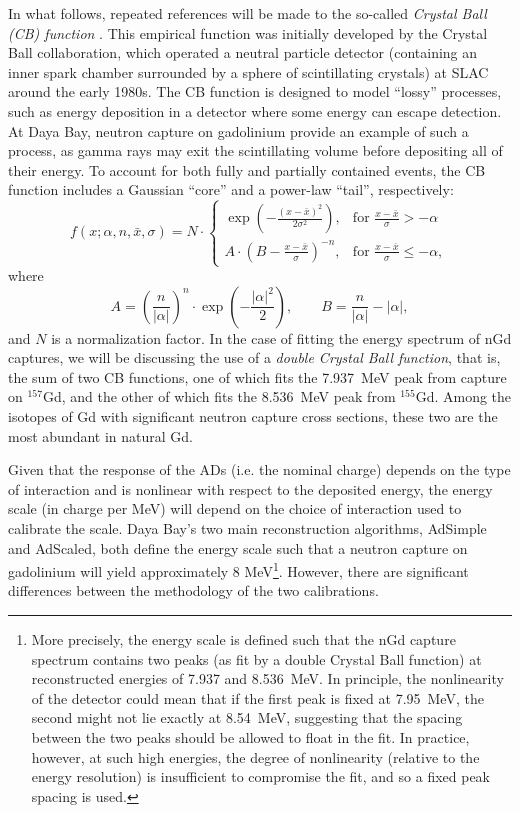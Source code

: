 \documentclass[../thesis.tex]{subfiles}
\begin{document}
In what follows, repeated references will be made to the so-called \emph{Crystal Ball (CB) function} \cite{cbfunction}. This empirical function was initially developed by the Crystal Ball collaboration, which operated a neutral particle detector (containing an inner spark chamber surrounded by a sphere of scintillating crystals) at SLAC around the early 1980s. The CB function is designed to model ``lossy'' processes, such as energy deposition in a detector where some energy can escape detection. At Daya Bay, neutron capture on gadolinium provide an example of such a process, as gamma rays may exit the scintillating volume before depositing all of their energy. To account for both fully and partially contained events, the CB function includes a Gaussian ``core'' and a power-law ``tail'', respectively:
\begin{equation}
  \label{eq:cbfunction}
  f(x;\alpha,n,\bar x,\sigma) = N \cdot \begin{cases} \exp(- \frac{(x - \bar x)^2}{2 \sigma^2}), & \mbox{for }\frac{x - \bar x}{\sigma} > -\alpha \\
    A \cdot (B - \frac{x - \bar x}{\sigma})^{-n}, & \mbox{for }\frac{x - \bar x}{\sigma} \leqslant -\alpha,\end{cases}
\end{equation}
where
\[
  A = \left(\frac{n}{\left| \alpha \right|}\right)^n \cdot \exp\left(- \frac {\left| \alpha \right|^2}{2}\right),%
  \qquad%
  B = \frac{n}{\left| \alpha \right|}  - \left| \alpha \right|,
\]
and $N$ is a normalization factor. In the case of fitting the energy spectrum of nGd captures, we will be discussing the use of a \emph{double Crystal Ball function}, that is, the sum of two CB functions, one of which fits the 7.937~MeV peak from capture on $^{157}$Gd, and the other of which fits the 8.536~MeV peak from $^{155}$Gd. Among the isotopes of Gd with significant neutron capture cross sections, these two are the most abundant in natural Gd.

Given that the response of the ADs (i.e. the nominal charge) depends on the type of interaction and is nonlinear with respect to the deposited energy, the energy scale (in charge per MeV) will depend on the choice of interaction used to calibrate the scale. Daya Bay's two main reconstruction algorithms, AdSimple and AdScaled, both define the energy scale such that a neutron capture on gadolinium will yield approximately 8 MeV\footnote{More precisely, the energy scale is defined such that the nGd capture spectrum contains two peaks (as fit by a double Crystal Ball function) at reconstructed energies of 7.937 and 8.536~MeV. In principle, the nonlinearity of the detector could mean that if the first peak is fixed at 7.95~MeV, the second might not lie exactly at 8.54~MeV, suggesting that the spacing between the two peaks should be allowed to float in the fit. In practice, however, at such high energies, the degree of nonlinearity (relative to the energy resolution) is insufficient to compromise the fit, and so a fixed peak spacing is used.}. However, there are significant differences between the methodology of the two calibrations.
\end{document}
